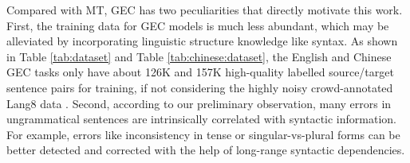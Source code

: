 \documentclass[11pt]{article}
\begin{document}
Compared with MT, GEC has two peculiarities that directly motivate this work.
First, the training data for GEC models is much less abundant, which may be alleviated by incorporating linguistic structure knowledge like syntax. 
As shown in Table \ref{tab:dataset} and Table \ref{tab:chinese:dataset}, the English and Chinese GEC tasks only have about 126K and 157K high-quality labelled source/target sentence pairs for training, if not  considering the highly noisy crowd-annotated Lang8 data  \citep{mita2020self}. 
Second, according to our preliminary observation, many errors in ungrammatical sentences are intrinsically correlated with syntactic information. 
For example, errors like inconsistency in tense or singular-vs-plural forms can be better detected and corrected with the help of long-range syntactic dependencies.  

\newcommand{\white}[1]{\textcolor{white}{#1}}
\newcommand{\brickred}[1]{\textcolor{brickred}{#1}}
\newcommand{\midnightblue}[1]{\textcolor{midnightblue}{#1}}
\newcommand{\salmon}[1]{\textcolor{salmon}{#1}}
\newcommand{\junglegreen}[1]{\textcolor{junglegreen}{#1}}
\newcommand{\forestgreen}[1]{\textcolor{forestgreen}{#1}}
\newcommand{\pinegreen}[1]{\textcolor{pinegreen}{#1}}
\newcommand{\seagreen}[1]{\textcolor{seagreen}{#1}}
\end{document}
